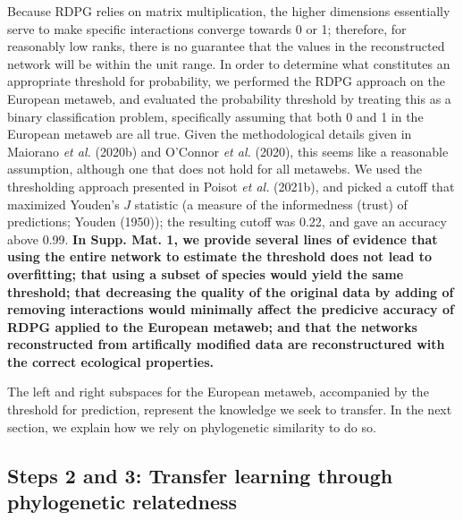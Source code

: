 \documentclass[11pt]{article}
\makeatletter
\def\maxwidth{\ifdim\Gin@nat@width>\linewidth\linewidth
\else\Gin@nat@width\fi}
\let\Oldincludegraphics\includegraphics
\renewcommand{\includegraphics}[1]{\Oldincludegraphics[width=\maxwidth]{#1}}
\providecommand{\DIFaddtex}[1]{{\bf #1}} %
\providecommand{\DIFaddbegin}{\protect\color{blue}} %
\providecommand{\DIFaddend}{\protect\color{black}} %
\providecommand{\DIFadd}[1]{\texorpdfstring{\DIFaddtex{#1}}{#1}} %
\newcommand{\DIFaddincludegraphics}[2][]{{\color{blue}\fbox{\DIFOincludegraphics[#1]{#2}}}} %
\DeclareRobustCommand{\DIFaddbegin}{\DIFOaddbegin \let\includegraphics\DIFaddincludegraphics} %
\DeclareRobustCommand{\DIFaddend}{\DIFOaddend \let\includegraphics\DIFOincludegraphics} %
\makeatother
\begin{document}
Because RDPG relies on matrix multiplication, the higher dimensions
essentially serve to make specific interactions converge towards 0 or 1;
therefore, for reasonably low ranks, there is no guarantee that the
values in the reconstructed network will be within the unit range. In
order to determine what constitutes an appropriate threshold for
probability, we performed the RDPG approach on the European metaweb, and
evaluated the probability threshold by treating this as a binary
classification problem, specifically assuming that both 0 and 1 in the
European metaweb are all true. Given the methodological details given in
Maiorano \emph{et al.} (2020b) and O'Connor \emph{et al.} (2020), this
seems like a reasonable assumption, although one that does not hold for
all metawebs. We used the thresholding approach presented in Poisot
\emph{et al.} (2021b), and picked a cutoff that maximized Youden's \(J\)
statistic (a measure of the informedness (trust) of predictions; Youden
(1950)); the resulting cutoff was 0.22, and gave an accuracy above 0.99.
\DIFaddbegin \DIFadd{In Supp. Mat. 1, we provide several lines of evidence that using the
entire network to estimate the threshold does not lead to overfitting;
that using a subset of species would yield the same threshold; that
decreasing the quality of the original data by adding of removing
interactions would minimally affect the predicive accuracy of RDPG
applied to the European metaweb; and that the networks reconstructed
from artifically modified data are reconstructured with the correct
ecological properties.
}\DIFaddend 

The left and right subspaces for the European metaweb, accompanied by
the threshold for prediction, represent the knowledge we seek to
transfer. In the next section, we explain how we rely on phylogenetic
similarity to do so.

\hypertarget{steps-2-and-3-transfer-learning-through-phylogenetic-relatedness}{%
\subsection{Steps 2 and 3: Transfer learning through phylogenetic
relatedness}\label{steps-2-and-3-transfer-learning-through-phylogenetic-relatedness}}
\end{document}
